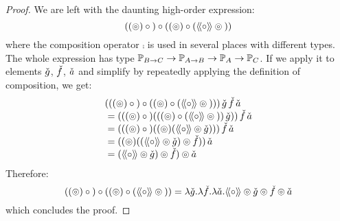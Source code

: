 \begin{proof}
We are left with the daunting high-order expression:
$$
((\circledcirc) \circ {}) \circ ((\circledcirc) \circ (\mathopen{\langle\!\langle}{\circ}\mathclose{\rangle\!\rangle} \circledcirc {}))
$$
where the composition operator $\comp$ is used in several places with different types.
The whole expression has type $\mathbb{P}_{B\rightarrow C}\rightarrow \mathbb{P}_{A\rightarrow B} \rightarrow \mathbb{P}_{A}\rightarrow \mathbb{P}_{C}$.
If we apply it to elements $\check{g}$, $\check{f}$, $\check{a}$ and simplify by repeatedly applying the definition of composition, we get:
$$
\begin{array}{l}
(((\pappl) \comp {}) \comp ((\pappl) \comp (\ppair{\comp} \pappl {})))\,
\pstr{g}\,\pstr{f}\,\pstr{a}\\
{}= (((\pappl) \comp {}) (((\pappl) \comp (\ppair{\comp} \pappl {}))\,\pstr{g}))\,
    \pstr{f}\,\pstr{a}\\
{}= (((\pappl) \comp {}) ((\pappl) (\ppair{\comp} \pappl\pstr{g})))\,
    \pstr{f}\,\pstr{a}\\
{}= ((\pappl) ((\ppair{\comp} \pappl\pstr{g}) \pappl \pstr{f}))\,\pstr{a}\\
{}= (\ppair{\comp} \pappl\pstr{g}) \pappl \pstr{f})\pappl\pstr{a}\\
\end{array}
$$
Therefore:
$$
((\circledcirc) \circ {}) \circ ((\circledcirc) \circ (\mathopen{\langle\!\langle}{\circ}\mathclose{\rangle\!\rangle} \circledcirc {}))
= \lambda \check{g}. \lambda \check{f}. \lambda \check{a}.
  \mathopen{\langle\!\langle}{\circ}\mathclose{\rangle\!\rangle} \circledcirc\check{g} \circledcirc \check{f} \circledcirc\check{a}
$$
which concludes the proof.
\end{proof}
